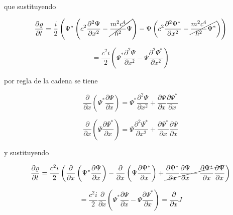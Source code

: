 \documentclass[12pt,a4paper]{article}
\begin{document}
\begin{enumerate}
    que sustituyendo
    
    \begin{equation*}
        \frac{\partial \varrho}{\partial t} = \frac{i}{2}\left(\Psi^* \left(c^2 \frac{\partial^2 \Psi}{\partial x^2} -\cancel{ \frac{m^2 c^4}{\hbar^2} \Psi} \right) - \Psi \left(c^2 \frac{\partial^2 \Psi^*}{\partial x^2} -\cancel{ \frac{m^2 c^4}{\hbar^2} \Psi^*} \right) \right)
    \end{equation*}
    
    \begin{equation*}
        = \frac{c^2i}{2}\left(\Psi^*  \frac{\partial^2 \Psi}{\partial x^2} - \Psi \frac{\partial^2 \Psi^*}{\partial x^2}  \right)
    \end{equation*}
    
    por regla de la cadena se tiene
    
    \begin{equation*}
        \frac{\partial}{\partial x} \left(\Psi^* \frac{\partial \Psi}{\partial x}\right) = \Psi^* \frac{\partial^2 \Psi}{\partial x^2} + \frac{\partial \Psi}{\partial x} \frac{\partial \Psi^*}{\partial x}
    \end{equation*}
    
    \begin{equation*}
        \frac{\partial}{\partial x} \left(\Psi \frac{\partial \Psi^*}{\partial x}\right) = \Psi \frac{\partial^2 \Psi^*}{\partial x^2} + \frac{\partial \Psi^*}{\partial x} \frac{\partial \Psi}{\partial x}
    \end{equation*}
    
    y sustituyendo
    
    \begin{equation*}
        \frac{\partial \varrho}{\partial t} = \frac{c^2i}{2}\left( \frac{\partial}{\partial x} \left(\Psi^* \frac{\partial \Psi}{\partial x}\right) - \frac{\partial}{\partial x} \left(\Psi \frac{\partial \Psi^*}{\partial x}\right) +\cancel{ \frac{\partial \Psi^*}{\partial x} \frac{\partial \Psi}{\partial x}  -  \frac{\partial \Psi^*}{\partial x} \frac{\partial \Psi}{\partial x}} \right)
    \end{equation*}
    
    \begin{equation*}
        = \frac{c^2i}{2} \frac{\partial}{\partial x}\left(  \Psi^* \frac{\partial \Psi}{\partial x} - \Psi \frac{\partial \Psi^*}{\partial x} \right) = \frac{\partial}{\partial x} J
    \end{equation*}
    

\end{enumerate}
\end{document}
